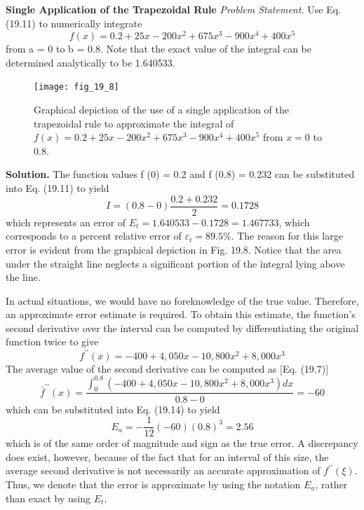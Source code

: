 \documentclass[../main.tex]{subfiles}
\begin{document}
\begin{exmp} \textbf{Single Application of the Trapezoidal Rule}
    \noindent\textit{Problem Statement.} Use Eq. (19.11) to numerically integrate
    \begin{equation}
		f(x)=0.2+25 x-200 x^{2}+675 x^{3}-900 x^{4}+400 x^{5}\nonumber
		\end{equation}
		from a = 0 to b = 0.8. Note that the exact value of the integral can be determined analytically to be 1.640533.

		\begin{figure}[H]
			\centering
			\texttt{[image: fig\_19\_8]}
		   \caption{\textsf{Graphical depiction of the use of a single application of the trapezoidal rule to approximate the integral of $f(x)=0.2+25 x-200 x^{2}+675 x^{3}-900 x^{4}+400 x^{5}$ from $x=0$ to $0.8$.}}\label{fig:fig_19_8}
		\end{figure}

	\noindent \textbf{Solution.} The function values f (0) = 0.2 and f (0.8) = 0.232 can be substituted into
	Eq. (19.11) to yield
	$$
I=(0.8-0) \frac{0.2+0.232}{2}=0.1728
$$
which represents an error of $E_{t}=1.640533-0.1728=1.467733$, which corresponds to a percent relative error of $\varepsilon_{t}=89.5 \%$. The reason for this large error is evident from the graphical depiction in Fig. 19.8. Notice that the area under the straight line neglects a significant portion of the integral lying above the line.

In actual situations, we would have no foreknowledge of the true value. Therefore, an approximate error estimate is required. To obtain this estimate, the function's second derivative over the interval can be computed by differentiating the original function twice to give
$$
f^{\prime \prime}(x)=-400+4,050 x-10,800 x^{2}+8,000 x^{3}
$$
The average value of the second derivative can be computed as [Eq. (19.7)]
$$
\bar{f}^{\prime \prime}(x)=\frac{\int_{0}^{0.8}\left(-400+4,050 x-10,800 x^{2}+8,000 x^{3}\right) d x}{0.8-0}=-60
$$
which can be substituted into Eq. (19.14) to yield
$$
E_{a}=-\frac{1}{12}(-60)(0.8)^{3}=2.56
$$
which is of the same order of magnitude and sign as the true error. A discrepancy does exist, however, because of the fact that for an interval of this size, the average second derivative is not necessarily an accurate approximation of $f^{\prime \prime}(\xi)$. Thus, we denote that the error is approximate by using the notation $E_{a}$, rather than exact by using $E_{t}$.
\end{exmp}
\end{document}

